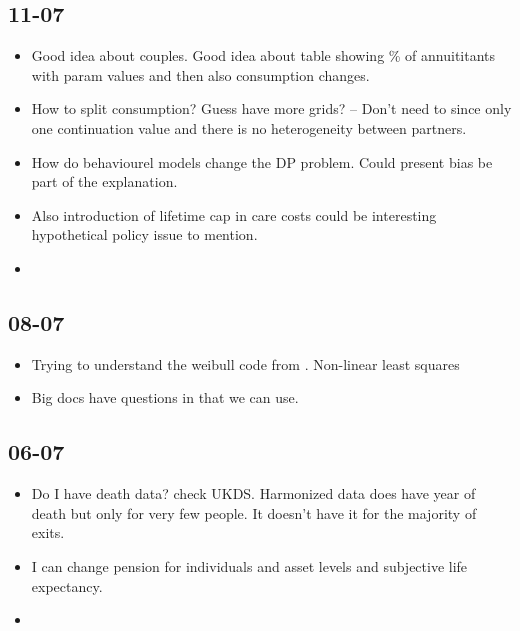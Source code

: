 \documentclass[12pt]{article}
\begin{document}
\subsection{\textbf{11-07}}
\begin{itemize}
  \item Good idea about couples. Good idea about table showing \% of annuititants
        with param values and then also consumption changes.

  \item How to split consumption? Guess have more grids? -- Don't need to since only one
        continuation value and there is no heterogeneity between partners.
  \item How do behaviourel models change the DP problem. Could present bias
        be part of the explanation.

  \item Also introduction of lifetime cap in care costs could be interesting
        hypothetical policy issue to mention.

  \item
\end{itemize}


\subsection{\textbf{08-07}}
\begin{itemize}
  \item Trying to understand the weibull code from \cite{odea_sturrock_rest_2023}. Non-linear
        least squares
  \item Big docs have questions in that we can use.
\end{itemize}

\subsection{\textbf{06-07}}
\begin{itemize}
  \item Do I have death data? check UKDS.
        Harmonized data does have year of death but only for very few
        people. It doesn't have it for the majority of exits.

  \item I can change pension for individuals and asset levels and subjective life expectancy.
  \item

\end{itemize}
\end{document}
